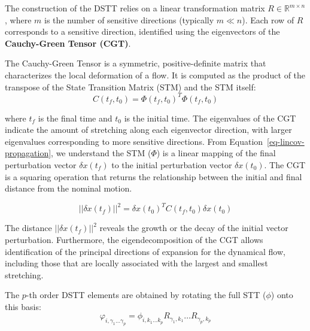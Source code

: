\documentclass[
  letterpaper,
  DIV=11,
  numbers=noendperiod,
  oneside]{scrartcl}
\begin{document}
The construction of the DSTT relies on a linear transformation matrix
\(R \in \mathbb{R}^{m \times n}\), where \(m\) is the number of
sensitive directions (typically \(m \ll n\)). Each row of \(R\)
corresponds to a sensitive direction, identified using the eigenvectors
of the \textbf{Cauchy-Green Tensor (CGT)}.

\begin{tcolorbox}[enhanced jigsaw, arc=.35mm, bottomrule=.15mm, bottomtitle=1mm, breakable, colback=white, colbacktitle=quarto-callout-note-color!10!white, colframe=quarto-callout-note-color-frame, coltitle=black, left=2mm, leftrule=.75mm, opacityback=0, opacitybacktitle=0.6, rightrule=.15mm, title=\textcolor{quarto-callout-note-color}{\faInfo}\hspace{0.5em}{Cauchy-Green Tensor (CGT)}, titlerule=0mm, toprule=.15mm, toptitle=1mm]

The Cauchy-Green Tensor is a symmetric, positive-definite matrix that
characterizes the local deformation of a flow. It is computed as the
product of the transpose of the State Transition Matrix (STM) and the
STM itself: \[
C(t_f,t_0) = \Phi(t_f,t_0)^T \Phi(t_f,t_0)
\]

where \(t_f\) is the final time and \(t_0\) is the initial time. The
eigenvalues of the CGT indicate the amount of stretching along each
eigenvector direction, with larger eigenvalues corresponding to more
sensitive directions. From Equation~\ref{eq-lincov-propagation}, we
understand the STM (\(\Phi\)) is a linear mapping of the final
perturbation vector \(\delta x(t_f)\) to the initial perturbation vector
\(\delta x(t_0)\). The CGT is a squaring operation that returns the
relationship between the initial and final distance from the nominal
motion.

\[
||\delta x(t_f)||^2 = \delta x(t_0)^T C(t_f,t_0) \delta x(t_0)
\]

The distance \(||\delta x(t_f)||^2\) reveals the growth or the decay of
the initial vector perturbation. Furthermore, the eigendecomposition of
the CGT allows identification of the principal directions of expansion
for the dynamical flow, including those that are locally associated with
the largest and smallest stretching.

\end{tcolorbox}

The \(p\)-th order DSTT elements are obtained by rotating the full STT
(\(\phi\)) onto this basis: \[
\varphi_{i, \gamma_1 \dots \gamma_p} = \phi_{i, k_1 \dots k_p} R_{\gamma_1, k_1} \dots R_{\gamma_p, k_p}
\]
\end{document}
